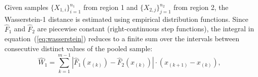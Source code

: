 \documentclass[AMA,Times1COL]{WileyNJDv5}
\begin{document}
Given samples $\{X_{1,i}\}_{i=1}^{n_1}$ from region 1 and $\{X_{2,j}\}_{j=1}^{n_2}$ from region 2, the Wasserstein-1 distance is estimated using empirical distribution functions. Since $\hat{F}_1$ and $\hat{F}_2$ are piecewise constant (right-continuous step functions), the integral in equation~(\ref{eq:wasserstein}) reduces to a finite sum over the intervals between consecutive distinct values of the pooled sample:
\begin{equation}
\widehat{W}_1 = \sum_{k=1}^{m-1} |\hat{F}_1(x_{(k)}) - \hat{F}_2(x_{(k)})| \cdot (x_{(k+1)} - x_{(k)}),
\label{eq:estimator}
\end{equation}
\end{document}
